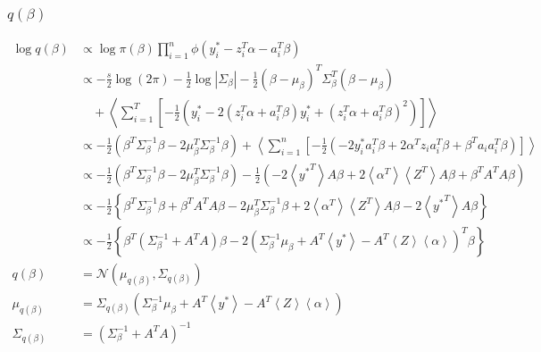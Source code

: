 \documentclass[11pt]{article}
\begin{document}
\subsubsection{$q\left(\beta\right)$}
\begin{align*}
  \log q\left(\beta\right) &\propto \log \pi\left(\beta\right)\prod_{i=1}^{n}\phi\left(y_{i}^{*}-z_{i}^{T}\alpha - a_{i}^{T}\beta \right) \\
  &\propto -\frac{s}{2}\log \left(2\pi\right) -\frac{1}{2}\log \left|\Sigma_{\beta}\right| -\frac{1}{2}\left(\beta-\mu_{\beta}\right)^{T}\Sigma_{\beta}^{T}\left(\beta-\mu_{\beta}\right) \\
  &\quad +\left\langle\sum_{i=1}^{T}\left[-\frac{1}{2}\left(y_{i}^{*} -2\left(z_{i}^{T}\alpha + a_{i}^{T}\beta\right)y_{i}^{*} + \left(z_{i}^{T}\alpha + a_{i}^{T}\beta\right)^{2}\right)\right]\right\rangle\\
  &\propto -\frac{1}{2}\left(\beta^{T}\Sigma_{\beta}^{-1}\beta -2\mu_{\beta}^{T}\Sigma_{\beta}^{-1}\beta\right) +\left\langle\sum_{i=1}^{n}\left[-\frac{1}{2}\left(-2y_{i}^{*}a_{i}^{T}\beta + 2\alpha^{T}z_{i}a_{i}^{T}\beta + \beta^{T}a_{i}a_{i}^{T}\beta\right)\right]\right\rangle\\
  &\propto -\frac{1}{2}\left(\beta^{T}\Sigma_{\beta}^{-1}\beta-2\mu_{\beta}^{T}\Sigma_{\beta}^{-1}\beta\right) - \frac{1}{2}\left(-2\left\langle{y^{*}}^{T}\right\rangle A\beta + 2\left\langle\alpha^{T}\right\rangle \left\langle Z^{T}\right\rangle A\beta + \beta^{T}A^TA\beta\right)\\
  &\propto -\frac{1}{2}\left\{\beta^{T}\Sigma_{\beta}^{-1}\beta + \beta^{T}A^{T}A\beta -2\mu_{\beta}^{T}\Sigma_{\beta}^{-1}\beta +2\left\langle \alpha^{T}\right\rangle \left\langle Z^{T}\right\rangle A\beta -2\left\langle{y^{*}}^{T}\right\rangle A\beta\right\}\\
  &\propto -\frac{1}{2}\left\{\beta^{T}\left(\Sigma_{\beta}^{-1} + A^{T}A\right)\beta -2\left(\Sigma_{\beta}^{-1}\mu_{\beta} +A^{T} \left\langle y^{*}\right\rangle -A^{T}\left\langle Z\right\rangle \left\langle \alpha\right\rangle \right)^{T}\beta\right\}\\
  q\left(\beta\right) &= \mathcal{N}\left(\mu_{q\left(\beta\right)}, \Sigma_{q\left(\beta\right)}\right)\\
  \mu_{q\left(\beta\right)} &= \Sigma_{q\left(\beta\right)} \left(\Sigma_{\beta}^{-1}\mu_{\beta} +A^{T} \left\langle y^{*}\right\rangle -A^{T}\left\langle Z\right\rangle \left\langle \alpha\right\rangle \right)\\
  \Sigma_{q\left(\beta\right)} &= \left(\Sigma_{\beta}^{-1} + A^{T}A\right)^{-1}
\end{align*}
\end{document}

